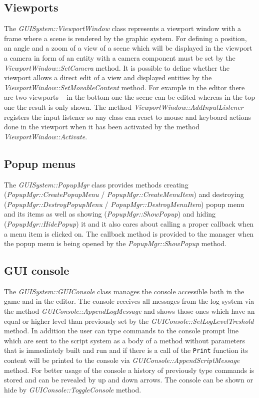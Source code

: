\subsection{Viewports}

The \emph{GUISystem::ViewportWindow} class represents a viewport window with a frame where a scene is rendered by the graphic system. For defining a position, an angle and a zoom of a view of a scene which will be displayed in the viewport a camera in form of an entity with a camera component must be set by the \emph{ViewportWindow::SetCamera} method. It is possible to define whether the viewport allows a direct edit of a view and displayed entities by the \emph{ViewportWindow::SetMovableContent} method. For example in the editor there are two viewports -- in the bottom one the scene can be edited whereas in the top one the result is only shown. The method \emph{ViewportWindow::AddInputListener} registers the input listener so any class can react to mouse and keyboard actions done in the viewport when it has been activated by the method \emph{ViewportWindow::Activate}.

\subsection{Popup menus}

The \emph{GUISystem::PopupMgr} class provides methods creating (\emph{Popup\-Mgr\-::\-Create\-Popup\-Menu} / \emph{PopupMgr::CreateMenuItem}) and destroying (\emph{PopupMgr::DestroyPopupMenu} / \emph{PopupMgr::DestroyMenuItem}) popup menu and its items as well as showing (\emph{PopupMgr::ShowPopup}) and hiding (\emph{PopupMgr::HidePopup}) it and it also cares about calling a proper callback when a menu item is clicked on. The callback method is provided to the manager when the popup menu is being opened by the \emph{PopupMgr::ShowPopup} method.

\subsection{GUI console}
\label{sec:gui-console}

The \emph{GUISystem::GUIConsole} class manages the console accessible both in the game and in the editor. The console receives all messages from the log system via the method \emph{GUIConsole::AppendLogMessage} and shows those ones which have an equal or higher level than previously set by the \emph{GUIConsole::SetLogLevelTreshold} method. In addition the user can type commands to the console prompt line which are sent to the script system as a body of a method without parameters that is immediately built and run and if there is a call of the \verb/Print/ function its content will be printed to the console via \emph{GUIConsole::AppendScriptMessage} method. For better usage of the console a history of previously type commands is stored and can be revealed by up and down arrows. The console can be shown or hide by \emph{GUIConsole::ToggleConsole} method.

